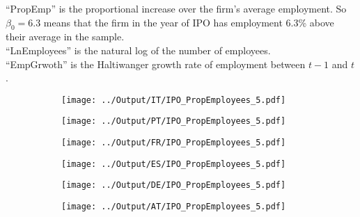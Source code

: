 \documentclass[12pt,notitlepage]{article}
\begin{document}
\begin{table}[!htpb]
\caption{IPO Regressions}
    \begin{center}


    \end{center}
        ``PropEmp'' is the proportional increase over the firm's average employment. So $\beta_0=$6.3 means that the firm in the year of IPO has employment 6.3\% above their average in the sample.\\
    ``LnEmployees'' is the natural log of the number of employees. \\
    ``EmpGrwoth'' is the Haltiwanger growth rate of employment between $t-1$ and $t$. 
\end{table}





\begin{figure}[!htpb]
\centering
\caption{Employment Growth Over IPOs}
\begin{subfigure}{.49\textwidth}
    \centering
 \texttt{[image: ../Output/IT/IPO\_PropEmployees\_5.pdf]}
\end{subfigure}%
\begin{subfigure}{.49\textwidth}
    \centering
 \texttt{[image: ../Output/PT/IPO\_PropEmployees\_5.pdf]}
\end{subfigure}
\begin{subfigure}{.49\textwidth}
    \centering
 \texttt{[image: ../Output/FR/IPO\_PropEmployees\_5.pdf]}
\end{subfigure}%
\begin{subfigure}{.49\textwidth}
    \centering
 \texttt{[image: ../Output/ES/IPO\_PropEmployees\_5.pdf]}
\end{subfigure}
\begin{subfigure}{.49\textwidth}
    \centering
 \texttt{[image: ../Output/DE/IPO\_PropEmployees\_5.pdf]}
\end{subfigure}
\begin{subfigure}{.49\textwidth}
    \centering
 \texttt{[image: ../Output/AT/IPO\_PropEmployees\_5.pdf]}
\end{subfigure}
\end{figure}
\end{document}
